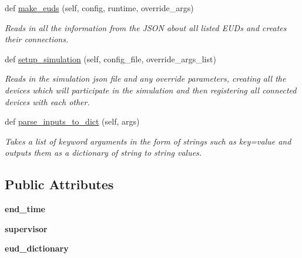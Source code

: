 \begin{DoxyCompactItemize}
def \hyperlink{class_build_1_1_simulation___operation_1_1simulation_1_1_simulation_setup_af80258397fde04bafc05f5b2f6bac3fe}{make\+\_\+euds} (self, config, runtime, override\+\_\+args)
\begin{DoxyCompactList}\small\item\em Reads in all the information from the J\+S\+ON about all listed E\+UD\textquotesingle{}s and creates their connections. \end{DoxyCompactList}\item 
def \hyperlink{class_build_1_1_simulation___operation_1_1simulation_1_1_simulation_setup_ab84075cdf159c767ccfc52549c9578ce}{setup\+\_\+simulation} (self, config\+\_\+file, override\+\_\+args\+\_\+list)
\begin{DoxyCompactList}\small\item\em Reads in the simulation json file and any override parameters, creating all the devices which will participate in the simulation and then registering all connected devices with each other. \end{DoxyCompactList}\item 
def \hyperlink{class_build_1_1_simulation___operation_1_1simulation_1_1_simulation_setup_a7102754ff7f6788bd69dcd5fa08e530b}{parse\+\_\+inputs\+\_\+to\+\_\+dict} (self, args)
\begin{DoxyCompactList}\small\item\em Takes a list of keyword arguments in the form of strings such as \textquotesingle{}key=value\textquotesingle{} and outputs them as a dictionary of string to string values. \end{DoxyCompactList}\end{DoxyCompactItemize}
\subsection*{Public Attributes}
\begin{DoxyCompactItemize}
\item 
\mbox{\label{class_build_1_1_simulation___operation_1_1simulation_1_1_simulation_setup_a8c337374126df47d0fa7e596cb5cd2d5}} 
{\bfseries end\+\_\+time}
\item 
\mbox{\label{class_build_1_1_simulation___operation_1_1simulation_1_1_simulation_setup_a0260870db8fb3663315fbdff7e073d8e}} 
{\bfseries supervisor}
\item 
\mbox{\label{class_build_1_1_simulation___operation_1_1simulation_1_1_simulation_setup_ae6b222d0c0f67d5c71c7949f07c262e5}} 
{\bfseries eud\+\_\+dictionary}
\end{DoxyCompactItemize}
